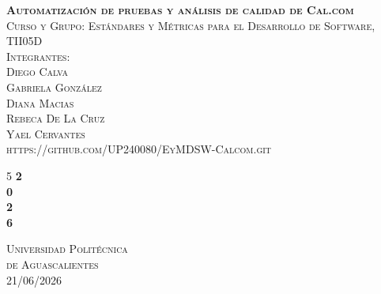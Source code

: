 \documentclass{article}
\begin{document}
\setlength{\parindent}{0pt}
\begin{titlepage}
    \thispagestyle{empty}
{\huge \textsc{\textbf{Automatización de pruebas y análisis
de calidad de Cal.com}}}\\ [6pt]
    {\Large \textsc{Curso y Grupo: Estándares y Métricas para el Desarrollo de Software, TII05D}}\\[2pt]
    {\Large \textsc{Integrantes:\\Diego Calva \\ Gabriela González\\ Diana Macias\\ Rebeca De La Cruz\\ Yael Cervantes \\https://github.com/UP240080/EyMDSW-Calcom.git}} \\ [2pt]
    \begin{minipage}{3 cm}
    \hspace{0.3 cm} 
        
    \end{minipage} \hfill
    \begin{minipage}{4 cm}
        \begin{spacing}{5}
        {\color{white} \fontsize{60}{70} \selectfont \bfseries 2\\ 0\\ 2\\ 6} 
        \end{spacing}
    \end{minipage}
    \vfill
    \begin{flushleft}
      \color{white} { {\large \textsc{Universidad Politécnica\\ de Aguascalientes\\ 21/06/2026}} \\ [10pt]

        }
    \end{flushleft}
\end{titlepage}

\begin{titlepage}
  \Large{\tableofcontents}
  
\end{titlepage}
\end{document}
